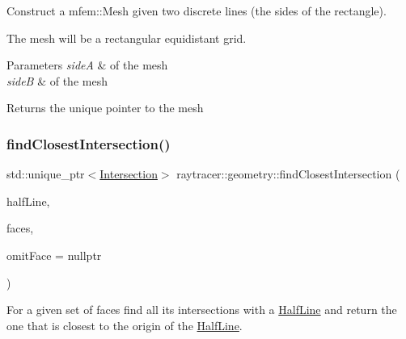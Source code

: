 Construct a mfem\+::\+Mesh given two discrete lines (the sides of the rectangle). 

The mesh will be a rectangular equidistant grid.


\begin{DoxyParams}{Parameters}
{\em sideA} & of the mesh \\
\hline
{\em sideB} & of the mesh \\
\hline
\end{DoxyParams}
\begin{DoxyReturn}{Returns}
the unique pointer to the mesh 
\end{DoxyReturn}
\mbox{\label{namespaceraytracer_1_1geometry_ae05eacb910ded12afa671c5563e91b11}} 
\subsubsection{\texorpdfstring{find\+Closest\+Intersection()}{findClosestIntersection()}}
{\footnotesize\ttfamily std\+::unique\+\_\+ptr$<$\hyperlink{structraytracer_1_1geometry_1_1Intersection}{Intersection}$>$ raytracer\+::geometry\+::find\+Closest\+Intersection (\begin{DoxyParamCaption}\item[{const \hyperlink{structraytracer_1_1geometry_1_1HalfLine}{Half\+Line} \&}]{half\+Line,  }\item[{const std\+::vector$<$ \hyperlink{classraytracer_1_1geometry_1_1Face}{Face} $\ast$$>$ \&}]{faces,  }\item[{const \hyperlink{classraytracer_1_1geometry_1_1Face}{Face} $\ast$}]{omit\+Face = {\ttfamily nullptr} }\end{DoxyParamCaption})}



For a given set of faces find all its intersections with a \hyperlink{structraytracer_1_1geometry_1_1HalfLine}{Half\+Line} and return the one that is closest to the origin of the \hyperlink{structraytracer_1_1geometry_1_1HalfLine}{Half\+Line}. 

